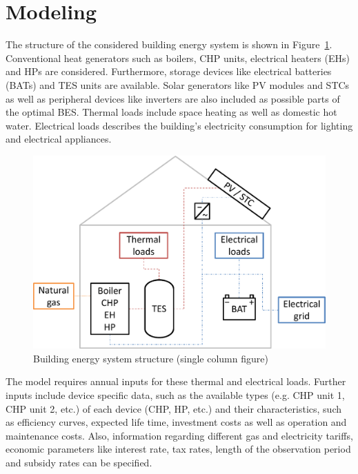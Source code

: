 \section{Modeling}
\label{sec:Modeling}

The structure of the considered building energy system is shown in Figure~\ref{fig:house_structure}.
Conventional heat generators such as boilers, CHP units, electrical heaters (EHs) and HPs are considered.
Furthermore, storage devices like electrical batteries (BATs) and TES units are available.
Solar generators like PV modules and STCs as well as peripheral devices like inverters are also included as possible parts of the optimal BES.
Thermal loads include space heating as well as domestic hot water.
Electrical loads describes the building's electricity consumption for lighting and electrical appliances.

\begin{figure}[h!]
	\begin{center}
		\includegraphics[width=\linewidth]{figures/house.pdf}
		\caption{Building energy system structure (single column figure)}
		\label{fig:house_structure}
	\end{center}
\end{figure}

The model requires annual inputs for these thermal and electrical loads.
Further inputs include device specific data, such as the available types (e.g. CHP unit 1, CHP unit 2, etc.) of each device (CHP, HP, etc.) and their characteristics, such as efficiency curves, expected life time, investment costs as well as operation and maintenance costs.
Also, information regarding different gas and electricity tariffs, economic parameters like interest rate, tax rates, length of the observation period and subsidy rates can be specified.

